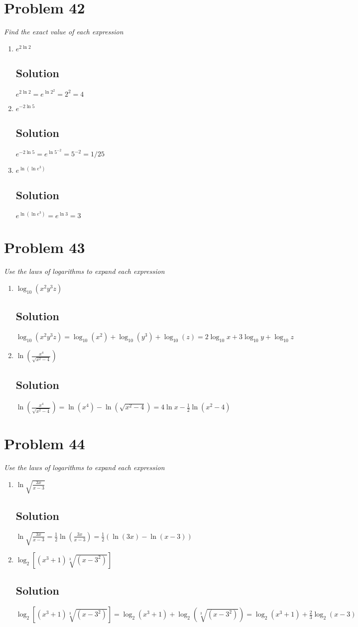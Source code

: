 \documentclass[11pt]{article}
\newcommand{\soln}{\subsection*}
\newcommand{\qn}{\textit}
\begin{document}
\section*{Problem 42}

\qn{Find the exact value of each expression}
\begin{enumerate}
	\item \qn{$e^{2\ln2}$}
	\soln{Solution}
	$e^{2\ln2}=e^{\ln2^2}=2^2=4$
	
	\item \qn{$e^{-2\ln5}$}
	\soln{Solution}
	$e^{-2\ln5}=e^{\ln{5^{-2}}}=5^{-2}=1/25$
	
	\item \qn{$e^{\ln(\ln{e^3})}$}
	\soln{Solution}
	$e^{\ln(\ln{e^3})}=e^{\ln3}=3$
\end{enumerate}

\section*{Problem 43}

\qn{Use the laws of logarithms to expand each expression}
\begin{enumerate}
	\item \qn{$\log_{10}(x^2y^3z)$}
	\soln{Solution}
	$\log_{10}(x^2y^3z)=\log_{10}(x^2)+\log_{10}(y^3)+\log_{10}(z)=2\log_{10}x+3\log_{10}y+\log_{10}z$
	
	\item \qn{$\ln(\frac{x^4}{\sqrt{x^2-4}})$}
	\soln{Solution}
	$\ln(\frac{x^4}{\sqrt{x^2-4}})=\ln(x^4)-\ln(\sqrt{x^2-4})=4\ln{x}-\frac{1}{2}\ln(x^2-4)$
\end{enumerate}

\section*{Problem 44}

\qn{Use the laws of logarithms to expand each expression}
\begin{enumerate}
	\item \qn{$\ln\sqrt{\frac{3x}{x-3}}$}
	\soln{Solution}
	$\ln\sqrt{\frac{3x}{x-3}}=\frac{1}{2}\ln(\frac{3x}{x-3})=\frac{1}{2}(\ln(3x)-\ln(x-3))$
	
	\item \qn{$\log_2[(x^3+1)\sqrt[3]{(x-3^2)}]$}
	\soln{Solution}
	$\log_2[(x^3+1)\sqrt[3]{(x-3^2)}]=\log_2(x^3+1)+\log_2(\sqrt[3]{(x-3^2)})=\log_2(x^3+1)+\frac{2}{3}\log_2(x-3)$
\end{enumerate}
\end{document}
